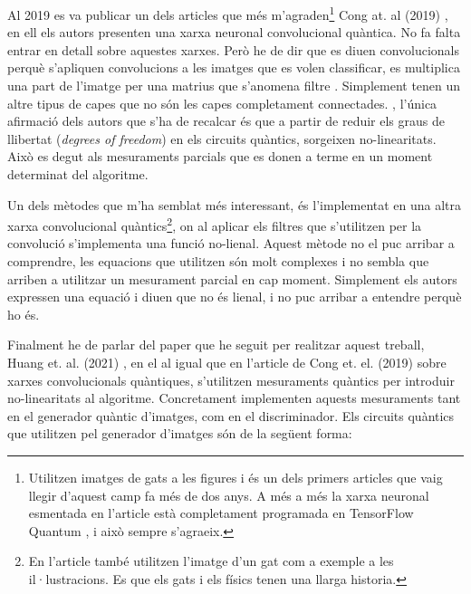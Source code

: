 Al 2019 es va publicar un dels articles que més m'agraden\footnote{Utilitzen imatges de gats a les figures i és un dels primers articles que vaig llegir d'aquest camp fa més de dos anys. A més a més la xarxa neuronal esmentada en l'article està completament programada en TensorFlow Quantum \cite{tfq}, i això sempre s'agraeix. } Cong at. al (2019) \cite{cong2019convolucional}, en ell els autors presenten una xarxa neuronal convolucional quàntica. No fa falta entrar en detall sobre aquestes xarxes. Però he de dir que es diuen convolucionals perquè s'apliquen convolucions a les imatges que es volen classificar, es multiplica una part de l'imatge per una matrius que s'anomena filtre \cite{CNN}. Simplement tenen un altre tipus de capes que no són les capes completament connectades. , l'única afirmació dels autors que s'ha de recalcar és que a partir de reduir els graus de llibertat (\textit{degrees of freedom}) en els circuits quàntics, sorgeixen no-linearitats. Això es degut als mesuraments parcials que es donen a terme en un moment determinat del algoritme. 

Un dels mètodes que m'ha semblat més interessant, és l'implementat en una altra xarxa convolucional quàntics\footnote{En l'article també utilitzen l'imatge d'un gat com a exemple a les il·lustracions. Es que els gats i els físics tenen una llarga historia. }, on al aplicar els filtres que s'utilitzen per la convolució s'implementa una funció no-lienal. Aquest mètode no el puc arribar a comprendre, les equacions que utilitzen són molt complexes i no sembla que arriben a utilitzar un mesurament parcial en cap moment. Simplement els autors expressen una equació i diuen que no és lienal, i no puc arribar a entendre perquè ho és. 

Finalment he de parlar del paper que he seguit per realitzar aquest treball, Huang et. al. (2021) \cite{QGAN_exp}, en el al igual que en l'article de Cong et. el. (2019) sobre xarxes convolucionals quàntiques, s'utilitzen mesuraments quàntics per introduir no-linearitats al algoritme. Concretament implementen aquests mesuraments tant en el generador quàntic d'imatges, com en el discriminador. Els circuits quàntics que utilitzen pel generador d'imatges són de la següent forma:

